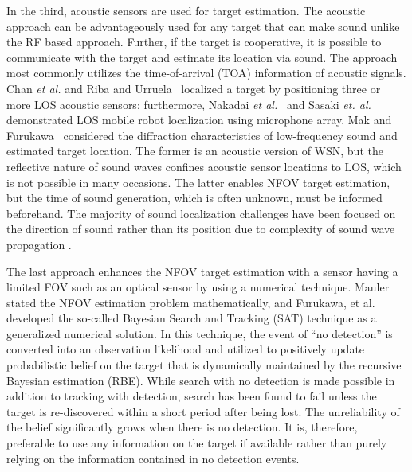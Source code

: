 In the third, acoustic sensors are used for target estimation. The acoustic approach can be advantageously used for any target that can make sound unlike the RF based approach. Further, if the target is cooperative, it is possible to communicate with the target and estimate its location via sound.  The approach most commonly utilizes the time-of-arrival (TOA) information of acoustic signals. Chan \textit{et al.} {\cite{cha06}} and Riba and Urruela~{\cite{rib05}} localized a target by positioning three or more LOS acoustic sensors; furthermore, Nakadai \textit{et al.}~{\cite{nakadai06}} and Sasaki \textit{et. al.}~{\cite{sasaki09}} demonstrated LOS mobile robot localization using microphone array. Mak and Furukawa~{\cite{Mak2009}} considered the diffraction characteristics of low-frequency sound and estimated target location. The former is an acoustic version of WSN, but the reflective nature of sound waves confines acoustic sensor locations to LOS, which is not possible in many occasions.  The latter enables NFOV target estimation, but the time of sound generation, which is often unknown, must be informed beforehand.  The majority of sound localization challenges have been focused on the direction of sound rather than its position due to complexity of sound wave propagation {\cite{mic03,sva12,lu10}}.

The last approach enhances the NFOV target estimation with a sensor having a limited FOV such as an optical sensor by using a numerical technique.  Mauler \cite{mau03} stated the NFOV estimation problem mathematically, and Furukawa, et al. \cite{fur06,fur12} developed the so-called Bayesian Search and Tracking (SAT) technique as a generalized numerical solution.  In this technique, the event of ``no detection'' is converted into an observation likelihood and utilized to positively update probabilistic belief on the target that is dynamically maintained by the recursive Bayesian estimation (RBE).  While search with no detection is made possible in addition to tracking with detection, search has been found to fail unless the target is re-discovered within a short period after being lost.  The unreliability of the belief significantly grows when there is no detection.  It is, therefore, preferable to use any information on the target if available rather than purely relying on the information contained in no detection events.
  

